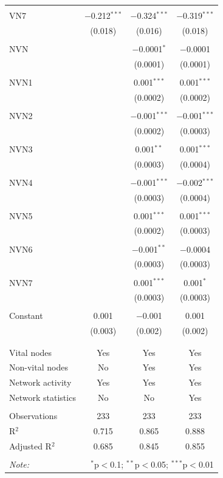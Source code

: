 \begin{table}[!htbp]
\begin{tabular}{@{\extracolsep{5pt}}lccc}
  & & & \\ 
 VN7 & $-$0.212$^{***}$ & $-$0.324$^{***}$ & $-$0.319$^{***}$ \\ 
  & (0.018) & (0.016) & (0.018) \\ 
  & & & \\ 
 NVN &  & $-$0.0001$^{*}$ & $-$0.0001 \\ 
  &  & (0.0001) & (0.0001) \\ 
  & & & \\ 
 NVN1 &  & 0.001$^{***}$ & 0.001$^{***}$ \\ 
  &  & (0.0002) & (0.0002) \\ 
  & & & \\ 
 NVN2 &  & $-$0.001$^{***}$ & $-$0.001$^{***}$ \\ 
  &  & (0.0002) & (0.0003) \\ 
  & & & \\ 
 NVN3 &  & 0.001$^{**}$ & 0.001$^{***}$ \\ 
  &  & (0.0003) & (0.0004) \\ 
  & & & \\ 
 NVN4 &  & $-$0.001$^{***}$ & $-$0.002$^{***}$ \\ 
  &  & (0.0003) & (0.0004) \\ 
  & & & \\ 
 NVN5 &  & 0.001$^{***}$ & 0.001$^{***}$ \\ 
  &  & (0.0002) & (0.0003) \\ 
  & & & \\ 
 NVN6 &  & $-$0.001$^{**}$ & $-$0.0004 \\ 
  &  & (0.0003) & (0.0003) \\ 
  & & & \\ 
 NVN7 &  & 0.001$^{***}$ & 0.001$^{*}$ \\ 
  &  & (0.0003) & (0.0003) \\ 
  & & & \\ 
 Constant & 0.001 & $-$0.001 & 0.001 \\ 
  & (0.003) & (0.002) & (0.002) \\ 
  & & & \\ 
\hline \\[-1.8ex] 
Vital nodes & Yes & Yes & Yes \\ 
Non-vital nodes & No & Yes & Yes \\ 
Network activity & Yes & Yes & Yes \\ 
Network statistics & No & No & Yes \\ 
\hline &  &  &  \\ 
Observations & 233 & 233 & 233 \\ 
R$^{2}$ & 0.715 & 0.865 & 0.888 \\ 
Adjusted R$^{2}$ & 0.685 & 0.845 & 0.855 \\ 
\hline 
\hline \\[-1.8ex] 
\textit{Note:}  & \multicolumn{3}{r}{$^{*}$p$<$0.1; $^{**}$p$<$0.05; $^{***}$p$<$0.01} \\ 
\end{tabular} 
\end{table} 
